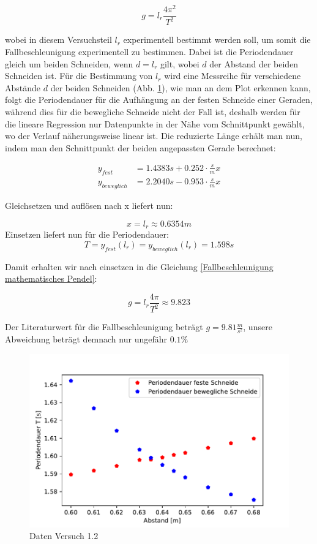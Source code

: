 \begin{equation} \label{Fallbeschleunigung mathematisches Pendel}
    g = l_r \frac{4 \pi^2}{T^2}
\end{equation}

wobei in diesem Versuchsteil $l_r$ experimentell bestimmt werden soll, um somit die Fallbeschleunigung experimentell zu bestimmen. Dabei ist die Periodendauer gleich um beiden Schneiden, wenn $d = l_r$ gilt, wobei $d$ der Abstand der beiden Schneiden ist. Für die Bestimmung von $l_r$ wird eine Messreihe für verschiedene Abstände $d$ der beiden Schneiden (Abb. \ref{fig:Pendel Versuch 1.1}), wie man an dem Plot erkennen kann, folgt die Periodendauer für die Aufhängung an der festen Schneide einer Geraden, während dies für die bewegliche Schneide nicht der Fall ist, deshalb werden für die lineare Regression nur Datenpunkte in der Nähe vom Schnittpunkt gewählt, wo der Verlauf näherungsweise linear ist. Die reduzierte Länge erhält man nun, indem man den Schnittpunkt der beiden angepassten Gerade berechnet:

\begin{align} 
    \nonumber y_{fest} &=  1.4383s + 0.252 \cdot \frac{s}{m} x\\
    \nonumber y_{beweglich} &= 2.2040s -0.953 \cdot \frac{s}{m} x
\end{align}

Gleichsetzen und auflösen nach x liefert nun:

    $$x=l_r \approx 0.6354m $$
    Einsetzen liefert nun für die Periodendauer:
    $$T = y_{fest}(l_r) = y_{beweglich}(l_r) = 1.598 s$$

Damit erhalten wir nach einsetzen in die Gleichung \ref{Fallbeschleunigung mathematisches Pendel}:

$$ g = l_r \frac{4 \pi}{T^2} \approx 9.823 $$

Der Literaturwert für die Fallbeschleunigung beträgt $g=9.81 \frac{m}{s^2}$, unsere Abweichung beträgt demnach nur ungefähr $0.1 \% $

\begin{figure}[ht]
    \centering
    \includegraphics[scale=0.8]{Pendel/Protokoll/fig/Pendel Versuch 1.2.pdf}
    \caption{Daten Versuch 1.2}
    \label{fig:Pendel Versuch 1.1}
\end{figure}

